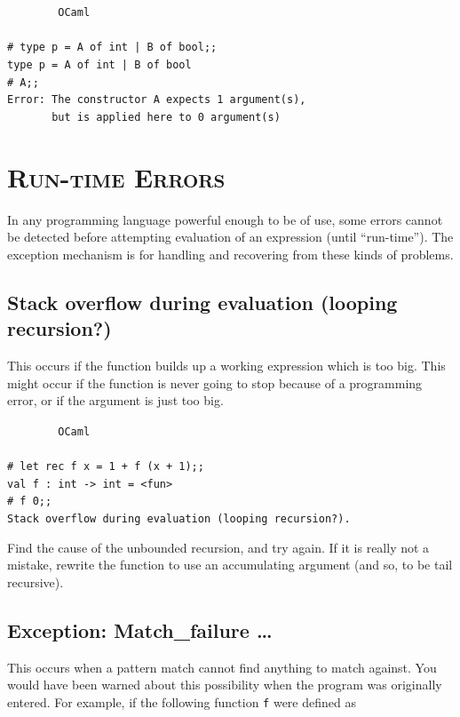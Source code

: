 \documentclass[]{book}
\newcommand{\smspace}{\vspace{4mm}}
\begin{document}
\smspace
\noindent\verb!        OCaml!\\
\noindent\\
\texttt{\# type p = A of int | B of bool;;}\\
\texttt{type p = A of int | B of bool}\\
\texttt{\# A;;}\\
\texttt{Error:\ The constructor A expects 1 argument(s),}\\
\verb!       !\texttt{but is applied here to 0 argument(s)}
\smspace

\section*{\scshape Run-time Errors}

In any programming language powerful enough to be of use, some errors cannot be detected before attempting evaluation of an expression (until ``run-time''). The exception mechanism is for handling and recovering from these kinds of problems.

\subsection*{Stack overflow during evaluation (looping recursion?)}

This occurs if the function builds up a working expression which is too big. This might occur if the function is never going to stop because of a programming error, or if the argument is just too big.

\smspace
\noindent\verb!        OCaml!\\
\noindent\\
\texttt{\# let rec f x = 1 + f (x + 1);;}\\
\texttt{val f :\ int -> int = <fun>}\\
\texttt{\# f 0;;}\\
\texttt{Stack overflow during evaluation (looping recursion?).}
\smspace

\noindent Find the cause of the unbounded recursion, and try again. If it is really not a mistake, rewrite the function to use an accumulating argument (and so, to be tail recursive).

\subsection*{Exception: Match\_failure \ldots}

This occurs when a pattern match cannot find anything to match against. You would have been warned about this possibility when the program was originally entered. For example, if the following function \texttt{f} were defined as 
\end{document}
